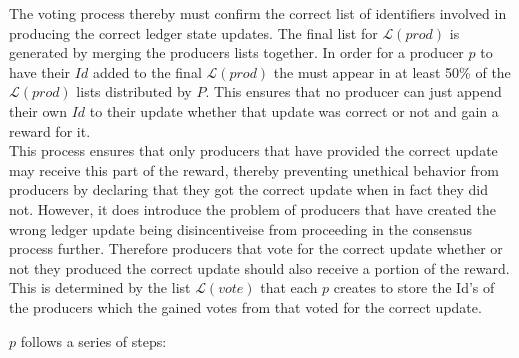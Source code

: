 The voting process thereby must confirm the correct list of identifiers involved in producing the correct ledger state updates. The final list for  $\mathcal{L}(prod)$ is generated by merging the producers lists together. In order for a producer $p$ to have their $Id$ added to the final  $\mathcal{L}(prod)$ the must appear in at least 50\% of the  $\mathcal{L}(prod)$ lists distributed by $P$. This ensures that no producer can just append their own $Id$ to their update whether that update was correct or not and gain a reward for it.  \\

This process ensures that only producers that have provided the correct update may receive this part of the reward, thereby preventing unethical behavior from producers by declaring that they got the correct update when in fact they did not. However, it does introduce the problem of producers that have created the wrong ledger update being disincentiveise from proceeding in the consensus process further. Therefore producers that vote for the correct update whether or not they produced the correct update should also receive a portion of the reward. This is determined by the list $\mathcal{L}(vote)$ that each $p$ creates to store the Id's of the producers which the gained votes from that voted for the correct update.

$p$ follows a series of steps:

